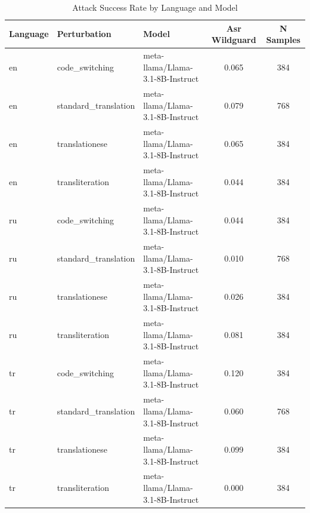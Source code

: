 \begin{table}[htbp]
\centering
\caption{Attack Success Rate by Language and Model}
\label{tab:asr}
\small
\begin{tabular}{lllcc}
\toprule
Language & Perturbation & Model & Asr Wildguard & N Samples \\
\midrule
en & code_switching & meta-llama/Llama-3.1-8B-Instruct & 0.065 & 384 \\
en & standard_translation & meta-llama/Llama-3.1-8B-Instruct & 0.079 & 768 \\
en & translationese & meta-llama/Llama-3.1-8B-Instruct & 0.065 & 384 \\
en & transliteration & meta-llama/Llama-3.1-8B-Instruct & 0.044 & 384 \\
ru & code_switching & meta-llama/Llama-3.1-8B-Instruct & 0.044 & 384 \\
ru & standard_translation & meta-llama/Llama-3.1-8B-Instruct & 0.010 & 768 \\
ru & translationese & meta-llama/Llama-3.1-8B-Instruct & 0.026 & 384 \\
ru & transliteration & meta-llama/Llama-3.1-8B-Instruct & 0.081 & 384 \\
tr & code_switching & meta-llama/Llama-3.1-8B-Instruct & 0.120 & 384 \\
tr & standard_translation & meta-llama/Llama-3.1-8B-Instruct & 0.060 & 768 \\
tr & translationese & meta-llama/Llama-3.1-8B-Instruct & 0.099 & 384 \\
tr & transliteration & meta-llama/Llama-3.1-8B-Instruct & 0.000 & 384 \\
\bottomrule
\end{tabular}
\end{table}